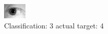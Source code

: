 \begin{figure}[h!]
\begin{center}
\includegraphics[width=0.60\columnwidth]{figures/ID1231_class_3_target_4.png}
\end{center}
\caption{ Classification: 3 actual target: 4}
\label{fig:ID1231_class_3_target_4}
\end{figure}
